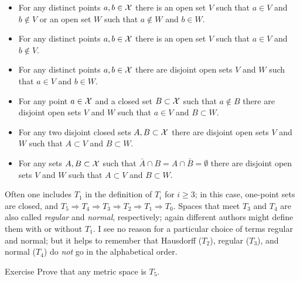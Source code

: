 \begin{itemize}
\item[$T_0$.] For any distinct points $a,b\in \mathcal{X}$ there is an open set $V$ such that $a\in V$ and $b\notin V$ or an open set $W$ such that $a\notin W$ and $b\in W$.
\item[$T_1$.] For any distinct points $a,b\in \mathcal{X}$ there is an open set $V$ such that $a\in V$ and $b\notin V$.
\item[$T_2$.] For any distinct points $a,b\in \mathcal{X}$ there are disjoint open sets $V$ and $W$ such that $a\in V$ and $b\in W$.
\item[$T_3$.] For any point $a\in \mathcal{X}$ and a closed set $B\subset \mathcal{X}$ such that $a\notin B$ there are disjoint open sets $V$ and $W$ such that $a\in V$ and $B\subset W$.
\item[$T_4$.] For any two disjoint closed sets $A,B\subset \mathcal{X}$ there are disjoint open sets $V$ and $W$ such that $A\subset V$ and $B\subset W$.
\item[$T_5$.] For any sets $A,B\subset \mathcal{X}$ such that $\bar A\cap B= A\cap \bar B=\emptyset$ there are disjoint open sets $V$ and $W$ such that $A\subset V$ and $B\subset W$.
\end{itemize}

\medskip

Often one includes $T_1$ in the definition of $T_i$ for $i\ge 3$;
in this case, one-point sets are closed, and $T_5\Rightarrow T_4\Rightarrow T_3\Rightarrow T_2\Rightarrow T_1\Rightarrow T_0$.
Spaces that meet $T_3$ and $T_4$ are also called \emph{regular} and \emph{normal}, respectively; again different authors might define them with or without $T_1$.
I see no reason for a particular choice of terms regular and normal;
but it helps to remember that Hausdorff ($T_2$), regular ($T_3$), and normal ($T_4$) do \textit{not} go in the alphabetical order.

\begin{thm}{Exercise}\label{ex:T5}
Prove that any metric space is $T_5$.
\end{thm}

